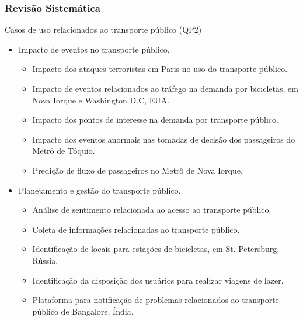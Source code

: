\documentclass{beamer}
\begin{document}
\begin{frame}
\frametitle{Revisão Sistemática}
\begin{block}{Casos de uso relacionados ao transporte público (QP2)}
\begin{itemize}
\item Impacto de eventos no transporte público.
\begin{itemize}
\item Impacto dos ataques terroristas em Paris no uso do transporte público.
\item Impacto de eventos relacionados ao tráfego na demanda por bicicletas, em Nova Iorque e Washington D.C, EUA.
\item Impacto dos pontos de interesse na demanda por transporte público.
\item Impacto dos eventos anormais nas tomadas de decisão dos passageiros do Metrô de Tóquio.
\item Predição de fluxo de passageiros no Metrô de Nova Iorque.
\end{itemize}

\item Planejamento e gestão do transporte público.
\begin{itemize}
\item Análise de sentimento relacionada ao acesso ao transporte público.
\item Coleta de informações relacionadas ao transporte público.
\item Identificação de locais para estações de bicicletas, em St. Petersburg, Rússia.
\item Identificação da disposição dos usuários para realizar viagens de lazer.
\item Plataforma para notificação de problemas relacionados ao transporte público de Bangalore, Índia.
\end{itemize}
\end{itemize}
\end{block}

\end{frame}
\end{document}
